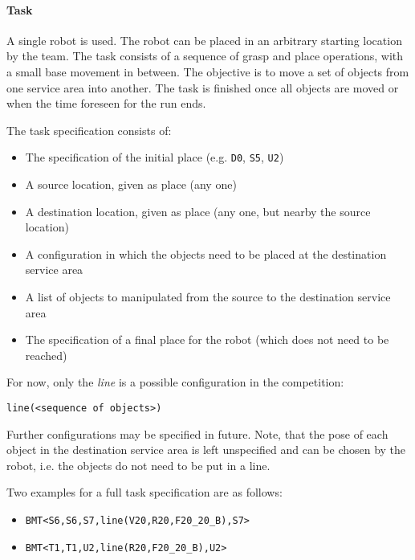 \paragraph{Task}
A single robot is used. The robot can be placed in an arbitrary starting location by the team. The task consists of a sequence of grasp and place operations, with a small base movement in between. The objective is to move a set of objects from one service area into another. The task is finished once all objects are moved or when the time foreseen for the run ends.
\par
The task specification consists of:
\begin{itemize}
	\item The specification of the initial place (e.g. \texttt{D0}, \texttt{S5}, \texttt{U2})
	\item A source location, given as place (any one)
	\item A destination location, given as place (any one, but nearby the source location)
	\item A configuration in which the objects need to be placed at the destination service area
	\item A list of objects to manipulated from the source to the destination service area
	\item The specification of a final place for the robot (which does not need to be reached)
\end{itemize}

For now, only the \emph{line} is a possible configuration in the competition:
\begin{center}
	\texttt{line(\textless sequence of objects\textgreater )}
\end{center}
\par
Further configurations may be specified in future. Note, that the pose  of each object in the destination service area is left unspecified and can be chosen by the robot, i.e. the objects do not need to be put in a line.

Two examples for a full task specification are as follows:
\begin{itemize}
	\item \texttt{BMT\textless \texttt{S6,S6,S7,line(V20,R20,F20\_20\_B),S7}\textgreater}
	\item \texttt{BMT\textless \texttt{T1,T1,U2,line(R20,F20\_20\_B),U2}\textgreater}

\end{itemize}


